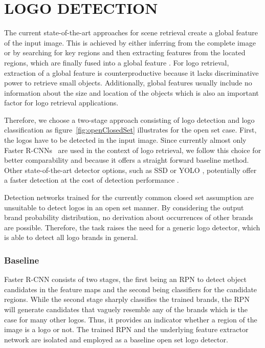 \documentclass[a4paper,twoside]{article}
\begin{document}
\section{\uppercase{Logo Detection}}
\noindent The current state-of-the-art approaches for scene retrieval create a global feature of the input image. This is achieved by either inferring from the complete image or by searching for key regions and then extracting features from the located regions, which are finally fused into a global feature \cite{torii2015,arandjelovic2016,kalantidis2016}. For logo retrieval, extraction of a global feature is counterproductive because it lacks discriminative power to retrieve small objects. Additionally, global features usually include no information about the size and location of the objects which is also an important factor for logo retrieval applications.

Therefore, we choose a two-stage approach consisting of logo detection and logo classification as figure~\ref{fig:openClosedSet} illustrates for the open set case. First, the logos have to be detected in the input image. 
Since currently almost only Faster R-CNNs~\cite{ren2015} are used in the context of logo retrieval, we follow this choice for better comparability and because it offers a straight forward baseline method.
Other state-of-the-art detector options, such as SSD \cite{liu2016b} or YOLO \cite{redmon2016}, potentially offer a faster detection at the cost of detection performance \cite{huang2016b}.

Detection networks trained for the currently common closed set assumption are unsuitable to detect logos in an open set manner. By considering the output brand probability distribution, no derivation about occurrences of other brands are possible. Therefore, the task raises the need for a generic logo detector, which is able to detect all logo brands in general.

\subsubsection*{Baseline}
\vspace*{-2.5mm}
Faster R-CNN consists of two stages, the first being an \ac{RPN} to detect object candidates in the feature maps and the second being classifiers for the candidate regions. While the second stage sharply classifies the trained brands, the \ac{RPN} will generate candidates that vaguely resemble any of the brands which is the case for many other logos. Thus, it provides an indicator whether a region of the image is a logo or not. The trained \ac{RPN} and the underlying feature extractor network are isolated and employed as a baseline open set logo detector. 
\end{document}
